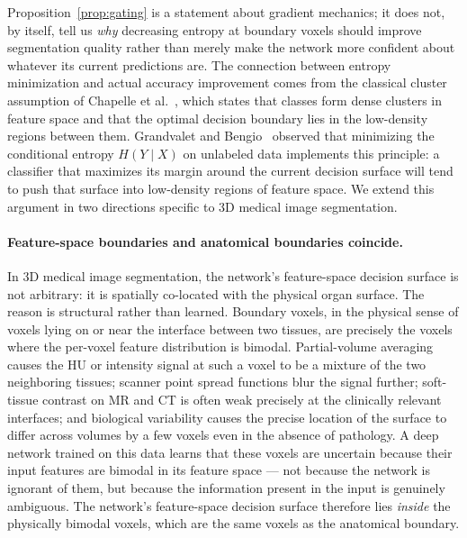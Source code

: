 Proposition~\ref{prop:gating} is a statement about gradient mechanics; it does not, by itself, tell us \emph{why} decreasing entropy at boundary voxels should improve segmentation quality rather than merely make the network more confident about whatever its current predictions are. The connection between entropy minimization and actual accuracy improvement comes from the classical cluster assumption of Chapelle et al.~\cite{chapelle2006ssl}, which states that classes form dense clusters in feature space and that the optimal decision boundary lies in the low-density regions between them. Grandvalet and Bengio~\cite{grandvalet2004entropy} observed that minimizing the conditional entropy $H(Y \mid X)$ on unlabeled data implements this principle: a classifier that maximizes its margin around the current decision surface will tend to push that surface into low-density regions of feature space. We extend this argument in two directions specific to 3D medical image segmentation.

\paragraph{Feature-space boundaries and anatomical boundaries coincide.}
In 3D medical image segmentation, the network's feature-space decision surface is not arbitrary: it is spatially co-located with the physical organ surface. The reason is structural rather than learned. Boundary voxels, in the physical sense of voxels lying on or near the interface between two tissues, are precisely the voxels where the per-voxel feature distribution is bimodal. Partial-volume averaging causes the HU or intensity signal at such a voxel to be a mixture of the two neighboring tissues; scanner point spread functions blur the signal further; soft-tissue contrast on MR and CT is often weak precisely at the clinically relevant interfaces; and biological variability causes the precise location of the surface to differ across volumes by a few voxels even in the absence of pathology. A deep network trained on this data learns that these voxels are uncertain because their input features are bimodal in its feature space --- not because the network is ignorant of them, but because the information present in the input is genuinely ambiguous. The network's feature-space decision surface therefore lies \emph{inside} the physically bimodal voxels, which are the same voxels as the anatomical boundary.

